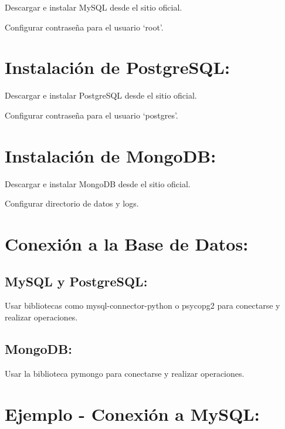 \documentclass[
  a4paper,
  onepage,
  openany]{scrreprt}
\begin{document}
Descargar e instalar MySQL desde el sitio oficial.

Configurar contraseña para el usuario `root'.

\hypertarget{instalaciuxf3n-de-postgresql-2}{%
\section{Instalación de
PostgreSQL:}\label{instalaciuxf3n-de-postgresql-2}}

Descargar e instalar PostgreSQL desde el sitio oficial.

Configurar contraseña para el usuario `postgres'.

\hypertarget{instalaciuxf3n-de-mongodb-2}{%
\section{Instalación de MongoDB:}\label{instalaciuxf3n-de-mongodb-2}}

Descargar e instalar MongoDB desde el sitio oficial.

Configurar directorio de datos y logs.

\hypertarget{conexiuxf3n-a-la-base-de-datos}{%
\section{Conexión a la Base de
Datos:}\label{conexiuxf3n-a-la-base-de-datos}}

\hypertarget{mysql-y-postgresql}{%
\subsection{MySQL y PostgreSQL:}\label{mysql-y-postgresql}}

Usar bibliotecas como mysql-connector-python o psycopg2 para conectarse
y realizar operaciones.

\hypertarget{mongodb}{%
\subsection{MongoDB:}\label{mongodb}}

Usar la biblioteca pymongo para conectarse y realizar operaciones.

\hypertarget{ejemplo---conexiuxf3n-a-mysql}{%
\section{Ejemplo - Conexión a
MySQL:}\label{ejemplo---conexiuxf3n-a-mysql}}
\end{document}
